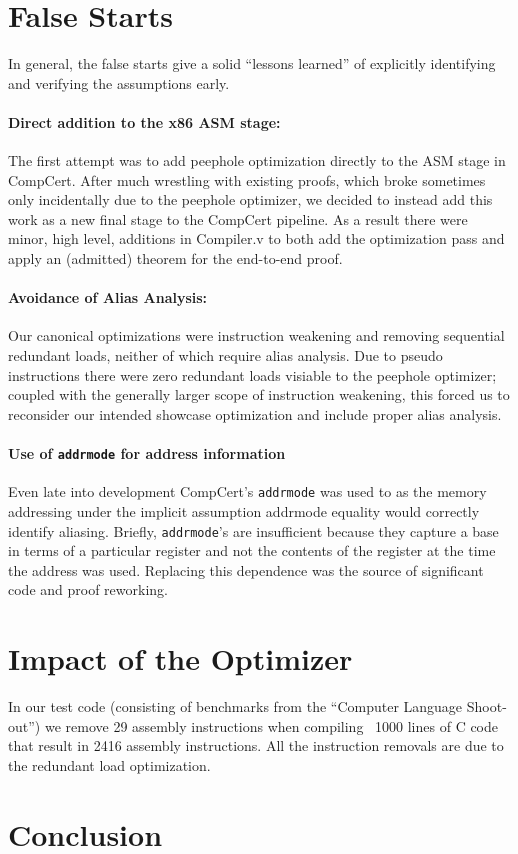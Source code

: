 \documentclass{article}
\begin{document}
\section{False Starts}
In general, the false starts give a solid ``lessons learned'' of
explicitly identifying and verifying the assumptions early.

\paragraph{Direct addition to the x86 ASM stage: }
The first attempt was to add peephole optimization directly to the ASM
stage in CompCert.  After much wrestling with existing proofs, which
broke sometimes only incidentally due to the peephole optimizer, we
decided to instead add this work as a new final stage to the CompCert
pipeline.  As a result there were minor, high level, additions in
Compiler.v to both add the optimization pass and apply an (admitted)
theorem for the end-to-end proof.

\paragraph{Avoidance of Alias Analysis: }
Our canonical optimizations were instruction weakening and removing
sequential redundant loads, neither of which require alias analysis.
Due to pseudo instructions there were zero redundant loads visiable to
the peephole optimizer; coupled with the generally larger scope of
instruction weakening, this forced us to reconsider our intended
showcase optimization and include proper alias analysis.

\paragraph{Use of {\tt addrmode} for address information}
Even late into development CompCert's {\tt addrmode} was used to as the
memory addressing under the implicit assumption addrmode equality would 
correctly identify aliasing.  Briefly, {\tt addrmode}'s are
insufficient because they capture a base in terms of a particular register
and not the contents of the register at the time the address was used.
Replacing this dependence was the source of significant code and proof
reworking.

\section{Impact of the Optimizer}
In our test code (consisting of benchmarks from the ``Computer
Language Shoot-out'') we remove 29 assembly instructions when
compiling ~1000 lines of C code that result in 2416 assembly
instructions.  All the instruction removals are due to the redundant
load optimization.

\section{Conclusion}
\end{document}
